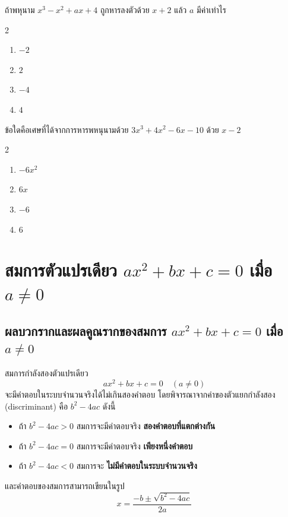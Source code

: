 \begin{examplebox}
	ถ้าพหุนาม $x^3-x^2+a x+4$ ถูกหารลงตัวด้วย $x+2$ แล้ว $a$ มีค่าเท่าไร
	\begin{multicols}{2}
		\begin{enumerate}
			\item $-2$
			\item $2$
			\item $-4$
			\item $4$
		\end{enumerate}
	\end{multicols}
\end{examplebox}

\begin{examplebox}
	ข้อใดคือเศษที่ได้จากการหารพหนุนามด้วย $3 x^3+4 x^2-6 x-10$ ด้วย $x-2$
	\begin{multicols}{2}
		\begin{enumerate}
			\item $-6x^2$
			\item $6 x$
			\item $-6$
			\item $6$
		\end{enumerate}
	\end{multicols}
\end{examplebox}

\section{สมการตัวแปรเดียว $ax^2+bx+c=0$ เมื่อ $a\neq 0$}
\subsection{ผลบวกรากและผลคูณรากของสมการ $ax^2+bx+c=0$ เมื่อ $a\neq 0$}
\begin{theorembox}
	สมการกำลังสองตัวแปรเดียว
	\[
	ax^2+bx+c=0 \quad (a\neq 0)
	\]
	จะมีคำตอบในระบบจำนวนจริงได้ไม่เกินสองคำตอบ  
	โดยพิจารณาจากค่าของตัวแยกกำลังสอง (discriminant) คือ $b^2-4ac$ ดังนี้
	\begin{itemize}
		\item ถ้า $b^2-4ac>0$ สมการจะมีคำตอบจริง \textbf{สองคำตอบที่แตกต่างกัน}
		\item ถ้า $b^2-4ac=0$ สมการจะมีคำตอบจริง \textbf{เพียงหนึ่งคำตอบ}
		\item ถ้า $b^2-4ac<0$ สมการจะ \textbf{ไม่มีคำตอบในระบบจำนวนจริง}
	\end{itemize}
	และคำตอบของสมการสามารถเขียนในรูป
	\[
	x=\dfrac{-b\pm\sqrt{b^2-4ac}}{2a}
	\]
\end{theorembox}

